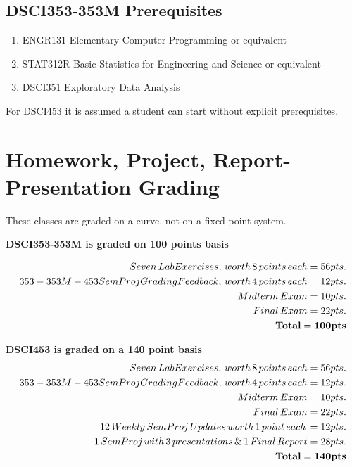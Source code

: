 \documentclass[11pt]{article} %
\begin{document}
  \subsection{DSCI353-353M Prerequisites}
  
    \begin{enumerate}
    	\item ENGR131 Elementary Computer Programming or equivalent
    	\item STAT312R Basic Statistics for Engineering and Science or equivalent
    	\item DSCI351 Exploratory Data Analysis 
    \end{enumerate}
    
  For DSCI453 it is assumed a student can start without explicit prerequisites. 

\section{Homework, Project, Report-Presentation Grading}

  These classes are graded on a curve, not on a fixed point system.
  
  {\bf DSCI353-353M is graded on 100 points basis}
  
    \begin{align*}
      Seven \, Lab Exercises, \, worth \, 8 \, points \, each = 56 pts. \\
      353-353M-453 SemProj Grading Feedback, \, worth \, 4 \, points \, each = 12 pts. \\
      Midterm \, Exam = 10 pts. \\
      Final \, Exam = 22 pts. \\
      {\bf Total = 100 pts}
    \end{align*}
    
    {\bf DSCI453 is graded on a 140 point basis}
    \begin{align*}
      Seven \, Lab Exercises, \, worth \, 8 \, points \, each = 56 pts. \\
      353-353M-453 SemProj Grading Feedback, \, worth \, 4 \, points \, each = 12 pts. \\
      Midterm \, Exam = 10 pts. \\
      Final \, Exam = 22 pts. \\
      12 \, Weekly \, SemProj \, Updates \, worth \, 1 \, point \, each \, = 12 pts. \\
      1 \,SemProj \, with \,3 \,presentations \, \& \,1 \,Final \,Report = 28 pts. \\
      {\bf Total = 140 pts} 
    \end{align*}
    
\end{document}
